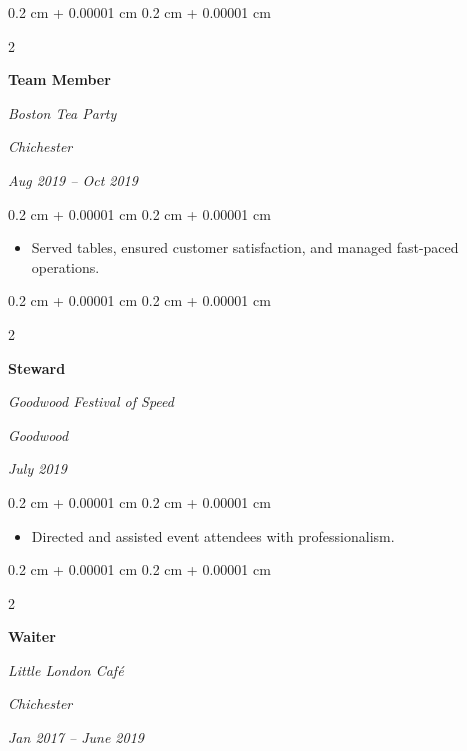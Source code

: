 \documentclass[10pt, letterpaper]{article}
\newenvironment{highlights}{
    \begin{itemize}[
        topsep=0.10 cm,
        parsep=0.10 cm,
        partopsep=0pt,
        itemsep=0pt,
        leftmargin=0.4 cm + 10pt
    ]
}{
    \end{itemize}
} %
\newenvironment{onecolentry}{
    \begin{adjustwidth}{
        0.2 cm + 0.00001 cm
    }{
        0.2 cm + 0.00001 cm
    }
}{
    \end{adjustwidth}
} %
\newenvironment{twocolentry}[2][]{
    \onecolentry
    \def\secondColumn{#2}
    \setcolumnwidth{\fill, 4.5 cm}
    \begin{paracol}{2}
}{
    \switchcolumn \raggedleft \secondColumn
    \end{paracol}
    \endonecolentry
} %
\begin{document}
        \vspace{0.2 cm}

        \begin{twocolentry}{
        \textit{Chichester}    
            
        \textit{Aug 2019 – Oct 2019}}
            \textbf{Team Member}
            
            \textit{Boston Tea Party}
        \end{twocolentry}

        \vspace{0.10 cm}
        \begin{onecolentry}
            \begin{highlights}
                \item Served tables, ensured customer satisfaction, and managed fast-paced operations.
            \end{highlights}
        \end{onecolentry}


        \vspace{0.2 cm}

        \begin{twocolentry}{
        \textit{Goodwood}    
            
        \textit{July 2019}}
            \textbf{Steward}
            
            \textit{Goodwood Festival of Speed}
        \end{twocolentry}

        \vspace{0.10 cm}
        \begin{onecolentry}
            \begin{highlights}
                \item Directed and assisted event attendees with professionalism.
            \end{highlights}
        \end{onecolentry}


        \vspace{0.2 cm}

        \begin{twocolentry}{
        \textit{Chichester}    
            
        \textit{Jan 2017 – June 2019}}
            \textbf{Waiter}
            
            \textit{Little London Café}
        \end{twocolentry}
\end{document}
